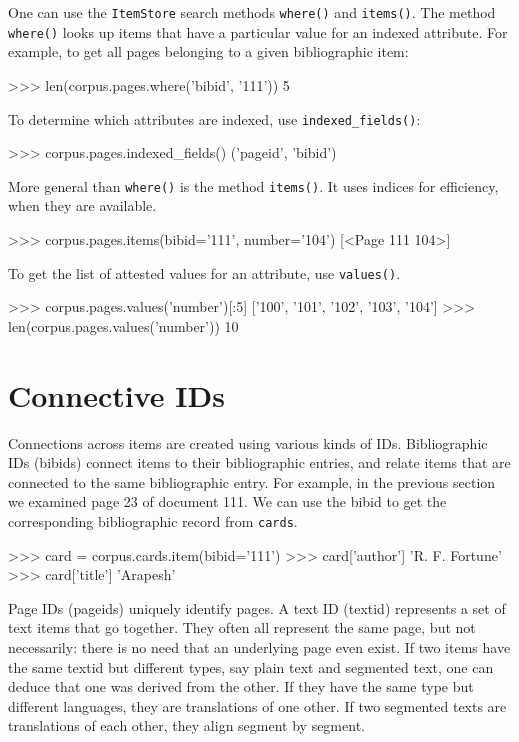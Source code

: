 One can use the {\tt ItemStore} search methods {\tt where()} and {\tt items()}.
The method {\tt where()} looks up items that have a particular value
for an indexed attribute.  For example, to get all pages belonging to
a given bibliographic item:
\begin{python}
>>> len(corpus.pages.where('bibid', '111'))
5
\end{python}
To determine which attributes are indexed, use \verb|indexed_fields()|:
\begin{python}
>>> corpus.pages.indexed_fields()
('pageid', 'bibid')
\end{python}
More general than {\tt where()} is the method {\tt items()}.  It uses indices for
efficiency, when they are available.
\begin{python}
>>> corpus.pages.items(bibid='111', number='104')
[<Page 111 104>]
\end{python}
To get the list of attested values for an attribute, use {\tt values()}.
\begin{python}
>>> corpus.pages.values('number')[:5]
['100', '101', '102', '103', '104']
>>> len(corpus.pages.values('number'))
10
\end{python}


\section{Connective IDs}

Connections across items are created using various kinds of IDs.  Bibliographic
IDs (bibids) connect items to their bibliographic entries, and relate
items that are connected to the same bibliographic entry.
For example, in the previous section we
examined page 23 of document 111.  We can use the bibid to get the
corresponding bibliographic record from {\tt cards}.
\begin{python}
>>> card = corpus.cards.item(bibid='111')
>>> card['author']
'R. F. Fortune'
>>> card['title']
'Arapesh'
\end{python}

Page IDs (pageids) uniquely identify pages.
A {\df text ID} (textid) represents a set of text items that go
together.  They often all represent the same
page, but not necessarily: there is no need that an underlying page
even exist.
If two items have the same textid but different types, say plain text
and segmented text, one
can deduce that one was derived from the other.  If they have the same
type but different languages, they are
translations of one other.  If two segmented texts are translations of
each other, they align segment by segment.

